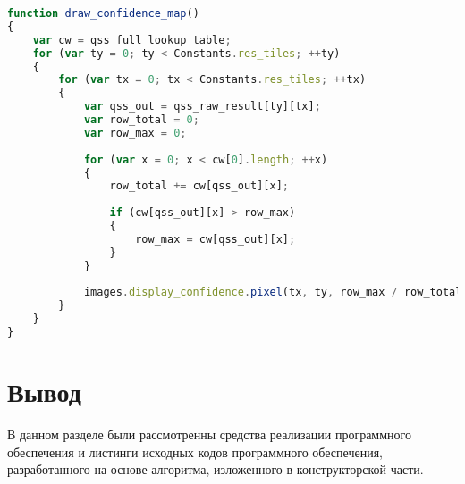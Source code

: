 \begin{lstlisting}[label=qmap,caption=Функция заполнения карты достоверности, language=javascript]
function draw_confidence_map()
{
	var cw = qss_full_lookup_table;
	for (var ty = 0; ty < Constants.res_tiles; ++ty)
	{
		for (var tx = 0; tx < Constants.res_tiles; ++tx)
		{
			var qss_out = qss_raw_result[ty][tx];
			var row_total = 0;
			var row_max = 0;
		
			for (var x = 0; x < cw[0].length; ++x)
			{
				row_total += cw[qss_out][x];
					
				if (cw[qss_out][x] > row_max)
				{
					row_max = cw[qss_out][x];
				}
			}
	
			images.display_confidence.pixel(tx, ty, row_max / row_total);
		}
	}
}
\end{lstlisting}

\section*{Вывод}

В данном разделе были рассмотренны средства реализации программного обеспечения и листинги исходных кодов программного обеспечения, разработанного на основе алгоритма, изложенного в конструкторской части.
